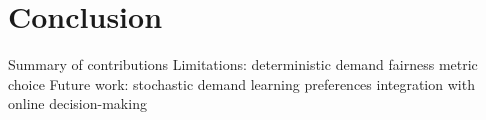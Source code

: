\section{Conclusion}

Summary of contributions
Limitations:
deterministic demand
fairness metric choice
Future work:
stochastic demand
learning preferences
integration with online decision-making